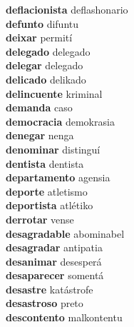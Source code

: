 \textbf{deflacionista } deflashonario \\
\textbf{defunto } difuntu \\
\textbf{deixar } permití \\
\textbf{delegado } delegado \\
\textbf{delegar } delegado \\
\textbf{delicado } delikado \\
\textbf{delincuente } kriminal \\
\textbf{demanda } caso \\
\textbf{democracia } demokrasia \\
\textbf{denegar } nenga \\
\textbf{denominar } distinguí \\
\textbf{dentista } dentista \\
\textbf{departamento } agensia \\
\textbf{deporte } atletismo \\
\textbf{deportista } atlétiko \\
\textbf{derrotar } vense \\
\textbf{desagradable } abominabel \\
\textbf{desagradar } antipatia \\
\textbf{desanimar } desesperá \\
\textbf{desaparecer } somentá \\
\textbf{desastre } katástrofe \\
\textbf{desastroso } preto \\
\textbf{descontento } malkontentu \\
